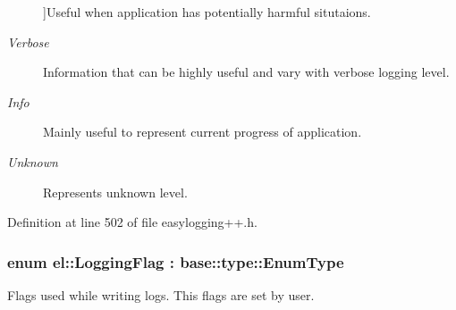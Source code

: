 \begin{Desc}
\begin{description}
{}]Useful when application has potentially harmful situtaions. \item[{\em 
\hypertarget{namespaceel_ab0ac6091262344c52dd2d3ad099e8e36ad4a9fa383ab700c5bdd6f31cf7df0faf}{}Verbose\label{namespaceel_ab0ac6091262344c52dd2d3ad099e8e36ad4a9fa383ab700c5bdd6f31cf7df0faf}
}]Information that can be highly useful and vary with verbose logging level. \item[{\em 
\hypertarget{namespaceel_ab0ac6091262344c52dd2d3ad099e8e36a4059b0251f66a18cb56f544728796875}{}Info\label{namespaceel_ab0ac6091262344c52dd2d3ad099e8e36a4059b0251f66a18cb56f544728796875}
}]Mainly useful to represent current progress of application. \item[{\em 
\hypertarget{namespaceel_ab0ac6091262344c52dd2d3ad099e8e36a88183b946cc5f0e8c96b2e66e1c74a7e}{}Unknown\label{namespaceel_ab0ac6091262344c52dd2d3ad099e8e36a88183b946cc5f0e8c96b2e66e1c74a7e}
}]Represents unknown level. \end{description}
\end{Desc}


Definition at line 502 of file easylogging++.\+h.

\hypertarget{namespaceel_a2784aacd04cb7816ac1c0b20fcbf83cb}{}
\subsubsection[{Logging\+Flag}]{\setlength{\rightskip}{0pt plus 5cm}enum {\bf el\+::\+Logging\+Flag} \+: {\bf base\+::type\+::\+Enum\+Type}\hspace{0.3cm}{\ttfamily [strong]}}\label{namespaceel_a2784aacd04cb7816ac1c0b20fcbf83cb}


Flags used while writing logs. This flags are set by user. 

